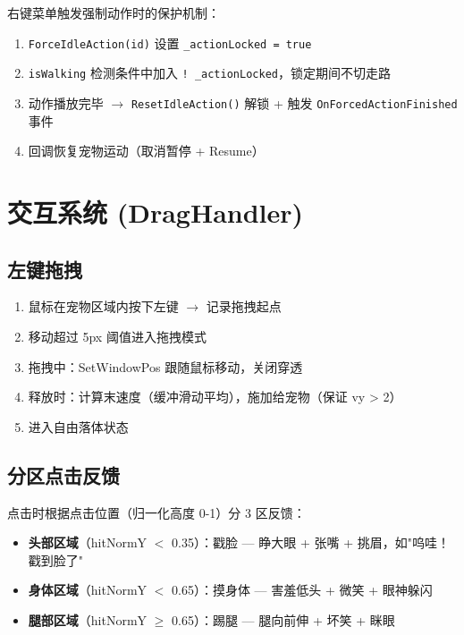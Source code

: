 \documentclass[12pt,a4paper]{ctexart}
\begin{document}
右键菜单触发强制动作时的保护机制：

\begin{enumerate}
    \item \texttt{ForceIdleAction(id)} 设置 \texttt{\_actionLocked = true}
    \item \texttt{isWalking} 检测条件中加入 \texttt{!\ \_actionLocked}，锁定期间不切走路
    \item 动作播放完毕 $\to$ \texttt{ResetIdleAction()} 解锁 + 触发 \texttt{OnForcedActionFinished} 事件
    \item 回调恢复宠物运动（取消暂停 + Resume）
\end{enumerate}

\section{交互系统 (DragHandler)}

\subsection{左键拖拽}

\begin{enumerate}
    \item 鼠标在宠物区域内按下左键 $\to$ 记录拖拽起点
    \item 移动超过 5px 阈值进入拖拽模式
    \item 拖拽中：SetWindowPos 跟随鼠标移动，关闭穿透
    \item 释放时：计算末速度（缓冲滑动平均），施加给宠物（保证 vy > 2）
    \item 进入自由落体状态
\end{enumerate}

\subsection{分区点击反馈}

点击时根据点击位置（归一化高度 0-1）分 3 区反馈：

\begin{itemize}
    \item \textbf{头部区域}（hitNormY $<$ 0.35）：戳脸 — 睁大眼 + 张嘴 + 挑眉，如"呜哇！戳到脸了"
    \item \textbf{身体区域}（hitNormY $<$ 0.65）：摸身体 — 害羞低头 + 微笑 + 眼神躲闪
    \item \textbf{腿部区域}（hitNormY $\geq$ 0.65）：踢腿 — 腿向前伸 + 坏笑 + 眯眼
\end{itemize}
\end{document}
